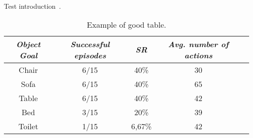 Test introduction~\cite{Sethian1996}.

\begin{table}[t]
    \centering
    \begin{tabular}{c|cccc}
        \toprule
        \textit{\textbf{Object Goal}} & \textit{\textbf{Successful episodes}} & \textit{\textbf{SR}} & \textit{\textbf{Avg. number of actions}}   \\ \midrule
        Chair                         & 6/15                                  & 40\%                 & 30                                       \\
        Sofa                          & 6/15                                  & 40\%                 & 65                                       \\
        Table                         & 6/15                                  & 40\%                 & 42                                       \\
        Bed                           & 3/15                                  & 20\%                 & 39                                       \\
        Toilet                        & 1/15                                  & 6,67\%               & 42                                       \\ \bottomrule
    \end{tabular}
    \caption{Example of good table.}
    \label{tab:vlv}
\end{table}